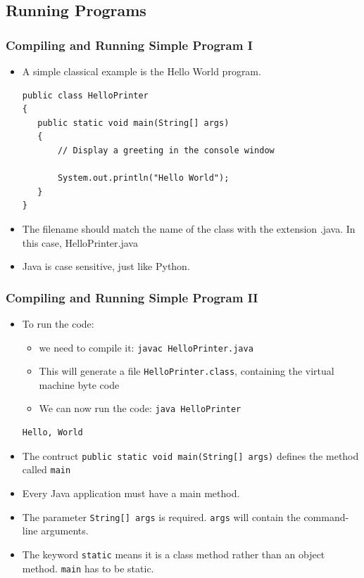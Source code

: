 \subsection{Running Programs}

\begin{frame}[fragile]
\frametitle{Compiling and Running Simple Program I}
\begin{itemize}
\item A simple classical example is the Hello World program. 
\codelist
\begin{lstlisting}
public class HelloPrinter
{
   public static void main(String[] args)
   {
       // Display a greeting in the console window

       System.out.println("Hello World");
   }
}
\end{lstlisting}
\item The filename should match the name of the class with the extension .java. In this case, HelloPrinter.java
\item Java is \alert{case sensitive}, just like Python.
\end{itemize}
\end{frame}

\begin{frame}[fragile]
\frametitle{Compiling and Running Simple Program II}
\begin{itemize}
\item To run the code:
\begin{itemize}
\item we need to compile it: \lstinline!javac HelloPrinter.java!
\item This will generate a file \lstinline!HelloPrinter.class!, containing the virtual machine byte code
\item We can now run the code: \lstinline!java HelloPrinter!
\end{itemize}
\reslist
\begin{lstlisting}[linewidth=5cm]
Hello, World
\end{lstlisting}
\item The contruct \lstinline!public static void main(String[] args)! defines the method called \lstinline!main!
\item Every Java application \alert{must} have a main method. 
\item The parameter \lstinline!String[] args! is required. \lstinline!args! will contain the command-line arguments.
\item The keyword \lstinline!static! means it is a class method rather than an object method. \lstinline!main! \alert{has} to be static.
\end{itemize}
\end{frame}


